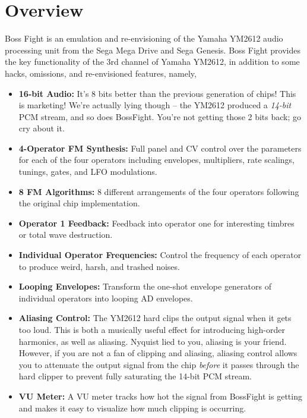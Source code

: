 \documentclass[12pt,letter]{article}
\begin{document}


\section*{Overview}

Boss Fight is an emulation and re-envisioning of the Yamaha YM2612 audio processing unit from the Sega Mega Drive and Sega Genesis. Boss Fight provides the key functionality of the 3rd channel of Yamaha YM2612, in addition to some hacks, omissions, and re-envisioned features, namely,
\begin{itemize}
  \item \textbf{16-bit Audio:} It's 8 bits better than the previous generation of chips! This is marketing! We're actually lying though -- the YM2612 produced a \textit{14-bit} PCM stream, and so does BossFight. You're not getting those 2 bits back; go cry about it.
  \item \textbf{4-Operator FM Synthesis:} Full panel and CV control over the parameters for each of the four operators including envelopes, multipliers, rate scalings, tunings, gates, and LFO modulations.
  \item \textbf{8 FM Algorithms:} 8 different arrangements of the four operators following the original chip implementation.
  \item \textbf{Operator 1 Feedback:} Feedback into operator one for interesting timbres or total wave destruction.
  \item \textbf{Individual Operator Frequencies:} Control the frequency of each operator to produce weird, harsh, and trashed noises.
  \item \textbf{Looping Envelopes:} Transform the one-shot envelope generators of individual operators into looping AD envelopes.
  \item \textbf{Aliasing Control:} The YM2612 hard clips the output signal when it gets too loud. This is both a musically useful effect for introducing high-order harmonics, as well as aliasing. Nyquist lied to you, aliasing is your friend. However, if you are not a fan of clipping and aliasing, aliasing control allows you to attenuate the output signal from the chip \textit{before} it passes through the hard clipper to prevent fully saturating the 14-bit PCM stream.
  \item \textbf{VU Meter:} A VU meter tracks how hot the signal from BossFight is getting and makes it easy to visualize how much clipping is occurring.

\end{itemize}
\end{document}

